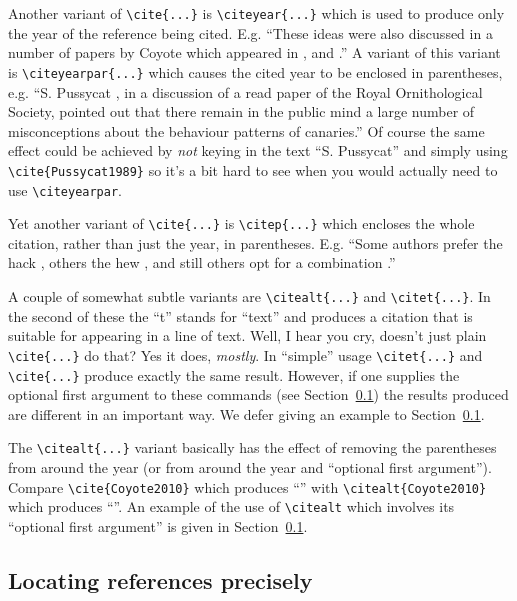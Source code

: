 \documentclass[times, doublespace]{anzsauth}
\begin{document}
Another variant of \verb!\cite{...}! is \verb!\citeyear{...}!
which is used to produce only the year of the reference being cited.
E.g. ``These ideas were also discussed in a number of papers by
Coyote which appeared in \citeyear{Coyote2001}, \citeyear{Coyote2007}
and \citeyear{Coyote2010}.''  A variant of this variant is
\verb!\citeyearpar{...}! which causes the cited year to be enclosed
in parentheses, e.g. ``S. Pussycat \citeyearpar{Pussycat1989}, in
a discussion of a read paper of the Royal Ornithological Society,
pointed out that there remain in the public mind a large number of
misconceptions about the behaviour patterns of canaries.''
Of course the same effect could be achieved by \emph{not}
keying in the text ``S. Pussycat'' and simply using
\verb!\cite{Pussycat1989}! so it's a bit hard to see when you
would actually need to use \verb!\citeyearpar!.

Yet another variant of \verb!\cite{...}! is \verb!\citep{...}! which
encloses the whole citation, rather than just the year, in
parentheses.  E.g. ``Some authors prefer the hack \citep{Cook1966},
others the hew \citep{Moore1967}, and still others opt for a
combination \citep{CookMoore1968}.''

A couple of somewhat subtle variants are \verb!\citealt{...}! and
\verb!\citet{...}!.  In the second of these the ``t'' stands for
``text'' and produces a citation that is suitable for appearing
in a line of text.  Well, I hear you cry, doesn't just plain
\verb!\cite{...}! do that?  Yes it does, \emph{mostly}.  In
``simple'' usage \verb!\citet{...}! and \verb!\cite{...}! produce
exactly the same result.  However, if one supplies the optional
first argument to these commands (see Section~\ref{sec:locPrecise})
the results produced are different in an important way.  We defer
giving an example to Section~\ref{sec:locPrecise}.

The \verb!\citealt{...}! variant basically has the effect of removing
the parentheses from around the year (or from around the year and
``optional first argument'').  Compare \verb!\cite{Coyote2010}! which
produces ``\cite{Coyote2010}'' with \verb!\citealt{Coyote2010}! which
produces ``\citealt{Coyote2010}''.  An example of the use of
\verb!\citealt!  which involves its ``optional first argument''
is given in Section~\ref{sec:locPrecise}.

\subsection{Locating references precisely}
\label{sec:locPrecise}
\end{document}

